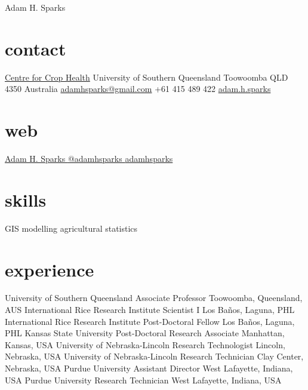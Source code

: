 
\hfill {\Huge Adam H. Sparks}

\begin{aside}
\small{\section{contact}
\href{http://www.usq.edu.au/research/research-at-usq/institutes-centres/cch}{Centre for Crop Health}
University of Southern Queensland
Toowoomba QLD 4350
Australia
\href{mailto:adamhsparks@gmail.com}{adamhsparks@gmail.com}
+61 415 489 422 \faMobilePhone{}
{\href{skype:adam.h.sparks?call}{adam.h.sparks }}
\section{web}
\href{https://ph.linkedin.com/pub/adam-sparks/8b/b96/507}{Adam H. Sparks {\color{linkedin}\FA {}}}
\href{https://www.twitter.com/adamhsparks/}{@adamhsparks {\color{twitter.blue}\FA {}}}
\href{https://github.com/adamhsparks/}{adamhsparks \FA {}}
\section{skills}
GIS
modelling
agricultural statistics}
\end{aside}

\section*{experience}
\begin{entrylist}
    {University of Southern Queensland}
    {Associate Professor}
    {Toowoomba, Queensland, AUS}
    {International Rice Research Institute}
    {Scientist I}
    {Los Ba\~nos, Laguna, PHL}
    {International Rice Research Institute}
    {Post-Doctoral Fellow}
    {Los Ba\~nos, Laguna, PHL}
    {Kansas State University}
    {Post-Doctoral Research Associate}
    {Manhattan, Kansas, USA}
   {University of Nebraska-Lincoln}
   {Research Technologist}
   {Lincoln, Nebraska, USA}
   {University of Nebraska-Lincoln}
   {Research Technician}
   {Clay Center, Nebraska, USA}
   {Purdue University}
   {Assistant Director}
   {West Lafayette, Indiana, USA}
   {Purdue University}
   {Research Technician}
   {West Lafayette, Indiana, USA}

\end{entrylist}


